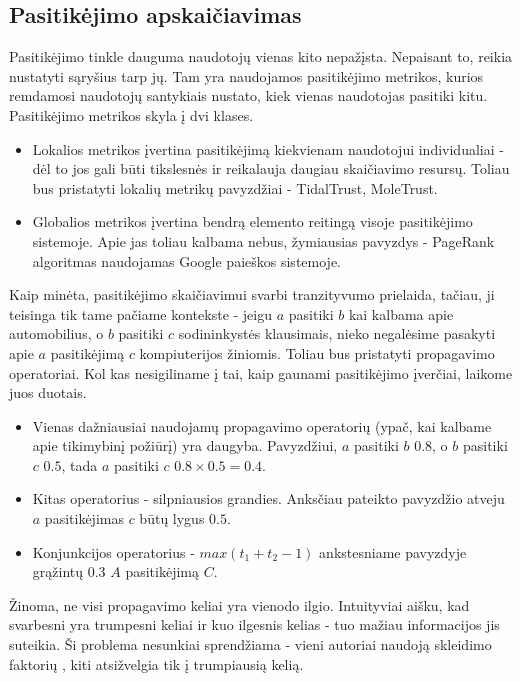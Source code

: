 \documentclass{VUMIFInfMagistrinis}
\begin{document}
\subsection{Pasitikėjimo apskaičiavimas}
Pasitikėjimo tinkle dauguma naudotojų vienas kito nepažįsta. Nepaisant to, reikia nustatyti sąryšius tarp jų. Tam yra naudojamos pasitikėjimo metrikos, kurios remdamosi naudotojų santykiais nustato, kiek vienas naudotojas pasitiki kitu. Pasitikėjimo metrikos skyla į dvi klases.
\begin{itemize}
	\item Lokalios metrikos įvertina pasitikėjimą kiekvienam naudotojui individualiai - dėl to jos gali būti tikslesnės ir reikalauja daugiau skaičiavimo resursų. Toliau bus pristatyti lokalių metrikų pavyzdžiai - TidalTrust, MoleTrust.
	\item Globalios metrikos įvertina bendrą elemento reitingą visoje pasitikėjimo sistemoje. Apie jas toliau kalbama nebus, žymiausias pavyzdys - PageRank algoritmas naudojamas Google paieškos sistemoje.
\end{itemize}
Kaip minėta, pasitikėjimo skaičiavimui svarbi tranzityvumo prielaida, tačiau, ji teisinga tik tame pačiame kontekste - jeigu $a$ pasitiki $b$ kai kalbama apie automobilius, o $b$ pasitiki $c$ sodininkystės klausimais, nieko negalėsime pasakyti apie $a$ pasitikėjimą $c$ kompiuterijos žiniomis.
\newline
Toliau bus pristatyti propagavimo operatoriai. Kol kas nesigiliname į tai, kaip gaunami pasitikėjimo įverčiai, laikome juos duotais.
\indent
\begin{itemize}
	\item Vienas dažniausiai naudojamų propagavimo operatorių (ypač, kai kalbame apie tikimybinį požiūrį) yra daugyba. Pavyzdžiui, $a$ pasitiki $b$ $0.8$, o $b$ pasitiki $c$ $0.5$, tada $a$ pasitiki $c$ $0.8 \times 0.5 = 0.4$. 
	\item Kitas operatorius - silpniausios grandies. Anksčiau pateikto pavyzdžio atveju $a$ pasitikėjimas $c$ būtų lygus $0.5$. 
	\item Konjunkcijos operatorius - $max(t_1+t_2-1)$ ankstesniame pavyzdyje grąžintų $0.3$ $A$ pasitikėjimą $C$.
\end{itemize}
Žinoma, ne visi propagavimo keliai yra vienodo ilgio. Intuityviai aišku, kad svarbesni yra trumpesni keliai ir kuo ilgesnis kelias - tuo mažiau informacijos jis suteikia. Ši problema nesunkiai sprendžiama - vieni autoriai naudoją skleidimo faktorių \cite{17}, kiti atsižvelgia tik į trumpiausią kelią.
\end{document}
